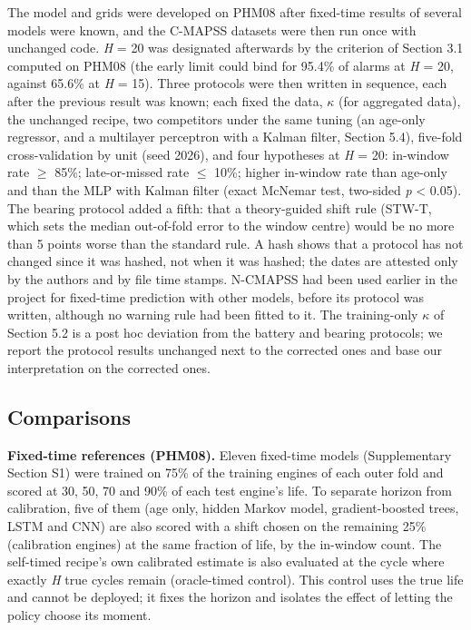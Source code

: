 \documentclass[a4paper,fleqn,doubleblind]{cas-dc}
\begin{document}
The model and grids were developed on PHM08 after fixed-time results of several models were known, and the C-MAPSS datasets were then run once with unchanged code. \textit{H} = 20 was designated afterwards by the criterion of Section 3.1 computed on PHM08 (the early limit could bind for 95.4\% of alarms at \textit{H} = 20, against 65.6\% at \textit{H} = 15). Three protocols were then written in sequence, each after the previous result was known; each fixed the data, $\kappa$ (for aggregated data), the unchanged recipe, two competitors under the same tuning (an age-only regressor, and a multilayer perceptron with a Kalman filter, Section 5.4), five-fold cross-validation by unit (seed 2026), and four hypotheses at \textit{H} = 20: in-window rate $\ge$ 85\%; late-or-missed rate $\le$ 10\%; higher in-window rate than age-only and than the MLP with Kalman filter (exact McNemar test, two-sided \textit{p} < 0.05). The bearing protocol added a fifth: that a theory-guided shift rule (STW-T, which sets the median out-of-fold error to the window centre) would be no more than 5 points worse than the standard rule. A hash shows that a protocol has not changed since it was hashed, not when it was hashed; the dates are attested only by the authors and by file time stamps. N-CMAPSS had been used earlier in the project for fixed-time prediction with other models, before its protocol was written, although no warning rule had been fitted to it. The training-only $\kappa$ of Section 5.2 is a post hoc deviation from the battery and bearing protocols; we report the protocol results unchanged next to the corrected ones and base our interpretation on the corrected ones.

\subsection{Comparisons}

\textbf{Fixed-time references (PHM08).} Eleven fixed-time models (Supplementary Section S1) were trained on 75\% of the training engines of each outer fold and scored at 30, 50, 70 and 90\% of each test engine's life. To separate horizon from calibration, five of them (age only, hidden Markov model, gradient-boosted trees, LSTM and CNN) are also scored with a shift chosen on the remaining 25\% (calibration engines) at the same fraction of life, by the in-window count. The self-timed recipe's own calibrated estimate is also evaluated at the cycle where exactly \textit{H} true cycles remain (oracle-timed control). This control uses the true life and cannot be deployed; it fixes the horizon and isolates the effect of letting the policy choose its moment.
\end{document}
